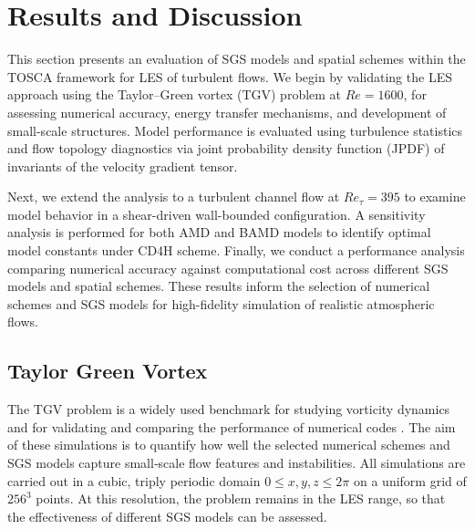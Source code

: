 \documentclass[final,3p]{elsarticle}
\begin{document}

\section{ \label{sec:results}
        Results and Discussion}

This section presents an evaluation of SGS models and spatial schemes within the TOSCA framework for LES of turbulent flows. We begin by validating the LES approach using the Taylor–Green vortex (TGV) problem at $Re = 1600$, for assessing numerical accuracy, energy transfer mechanisms, and development of small-scale structures. Model performance is evaluated using turbulence statistics and flow topology diagnostics via joint probability density function (JPDF) of invariants of the velocity gradient tensor.

Next, we extend the analysis to a turbulent channel flow at $Re_\tau = 395$ to examine model behavior in a shear-driven wall-bounded configuration. A sensitivity analysis is performed for both AMD and BAMD models to identify optimal model constants under CD4H scheme. Finally, we conduct a performance analysis comparing numerical accuracy against computational cost across different SGS models and spatial schemes. These results inform the selection of numerical schemes and SGS models for high-fidelity simulation of realistic atmospheric flows. 

\subsection{Taylor Green Vortex}
\label{sec:tgv}
The TGV problem is a widely used benchmark for studying vorticity dynamics \cite{orszag1974numerical, brachet1983small, sharma2019vorticity, engelmann2023direct} and for validating and comparing the performance of numerical codes \cite{gassner2013accuracy,chapelier2012inviscid,bull2015simulation,drikakis2007simulation,abdelsamie2021taylor}. The aim of these simulations is to quantify how well the selected numerical schemes and SGS models capture small‑scale flow features and instabilities. All simulations are carried out in a cubic, triply periodic domain \(0 \le x,y,z \le 2\pi\) on a uniform grid of \(256^{3}\) points. At this resolution, the problem remains in the LES range, so that the effectiveness of different SGS models can be assessed. 
\end{document}
